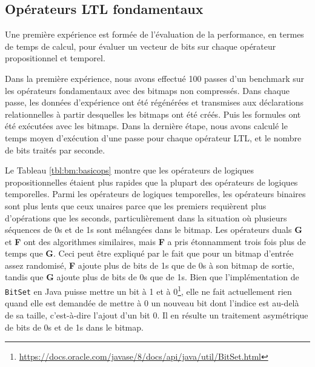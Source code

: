 \subsection{Opérateurs LTL fondamentaux} %

Une première expérience est formée de l'évaluation de la performance, en termes de temps de calcul, pour évaluer un vecteur de bits sur chaque opérateur propositionnel et temporel.

Dans la première expérience, nous avons effectué 100 passes d'un benchmark sur les opérateurs fondamentaux avec des bitmaps non compressés. Dans chaque passe, les données d'expérience ont été régénérées et transmises aux déclarations relationnelles à partir desquelles les bitmaps ont été créés. Puis les formules ont été exécutées avec les bitmaps. Dans la dernière étape, nous avons calculé le temps moyen d'exécution d'une passe pour chaque opérateur LTL, et le nombre de bits traités par seconde.

Le Tableau \ref{tbl:bm:basicops} montre que les opérateurs de logiques propositionnelles étaient plus rapides que la plupart des opérateurs de logiques temporelles. Parmi les opérateurs de logiques temporelles, les opérateurs binaires sont plus lents que ceux unaires parce que les premiers requièrent plus d'opérations que les seconds, particulièrement dans la situation où plusieurs séquences de 0s et de 1s sont mélangées dans le bitmap. Les opérateurs duals \textbf{G} et \textbf{F} ont des algorithmes similaires, mais \textbf{F} a pris étonnamment trois fois plus de temps que \textbf {G}. Ceci peut être expliqué par le fait que pour un bitmap d'entrée assez randomisé, \textbf{F} ajoute plus de bits de 1s que de 0s à son bitmap de sortie, tandis que \textbf{G} ajoute plus de bits de 0s que de 1s. Bien que l'implémentation de \texttt{BitSet} en Java puisse mettre un bit à 1 et à 0\footnote{\url{https://docs.oracle.com/javase/8/docs/api/java/util/BitSet.html}}, elle ne fait actuellement rien quand elle est demandée de mettre à 0 un nouveau bit dont l'indice est au-delà de sa taille, c'est-à-dire l'ajout d'un bit 0. Il en résulte un traitement asymétrique de bits de 0s et de 1s dans le bitmap.

